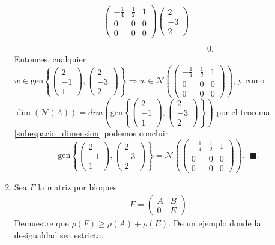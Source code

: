 \documentclass[11pt,letterpaper]{article}
\newcommand{\mcN}{\mathcal{N}}
\newcommand{\finf}{\blacksquare.}
\newcommand{\gen}{\text{gen}}
\begin{document}
\begin{enumerate}
\begin{align*}
\begin{pmatrix}
-\frac{1}{4}&\frac{1}{2}&1\\
0&0&0\\
0&0&0
\end{pmatrix}\begin{pmatrix}
2\\
-3\\
2
\end{pmatrix}\\ \\
&=0.
\end{align*}
Entonces, cualquier $w\in\gen\left\{\begin{pmatrix}
2\\
-1\\
1
\end{pmatrix},\begin{pmatrix}
2\\
-3\\
2
\end{pmatrix}\right\}\Rightarrow w\in \mcN\left(\begin{pmatrix}
-\frac{1}{4}&\frac{1}{2}&1\\
0&0&0\\
0&0&0
\end{pmatrix}\right)$, y como $\dim \left(\mcN(A) \right)=dim\left(\gen\left\{\begin{pmatrix}
2\\
-1\\
1
\end{pmatrix},\begin{pmatrix}
2\\
-3\\
2
\end{pmatrix}\right\}\right)$ por el teorema \ref{subespacio_dimension} podemos concluir 
$$\gen\left\{\begin{pmatrix}
2\\
-1\\
1
\end{pmatrix},\begin{pmatrix}
2\\
-3\\
2
\end{pmatrix}\right\} =\mcN\left(\begin{pmatrix}
-\frac{1}{4}&\frac{1}{2}&1\\
0&0&0\\
0&0&0
\end{pmatrix}\right).\ \ \ \finf$$
\item Sea $F$ la matriz por bloques
\begin{align*}
F=\begin{pmatrix}
A & B\\
0 & E
\end{pmatrix}
\end{align*}
Demuestre que $\rho(F)\geq \rho(A)+\rho(E).$ De un ejemplo donde la desigualdad sea estricta.


\end{enumerate}
\end{document}
